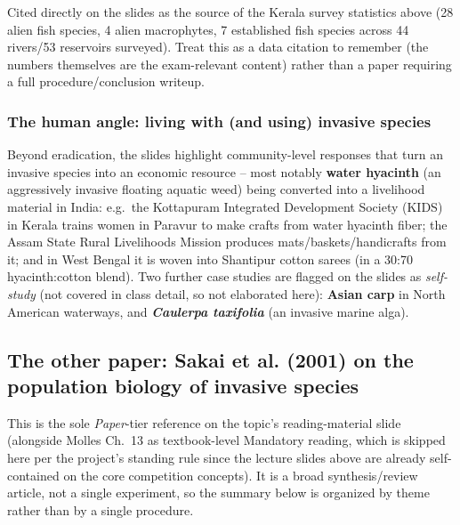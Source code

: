 \documentclass[11pt,a4paper]{article}
\begin{document}
\begin{papbox}[title={Slide case-study citation: Raj et al. (2021), \textit{Aquatic Ecosystem Health \& Management} 24(2), 64--75 -- ``Distribution of alien invasive species in aquatic ecosystems of the southern Western Ghats, India''}]
Cited directly on the slides as the source of the Kerala survey statistics above (28 alien fish species, 4 alien macrophytes, 7 established fish species across 44 rivers/53 reservoirs surveyed). Treat this as a data citation to remember (the numbers themselves are the exam-relevant content) rather than a paper requiring a full procedure/conclusion writeup.
\end{papbox}

\subsubsection*{The human angle: living with (and using) invasive species}
Beyond eradication, the slides highlight community-level responses that turn an invasive species into an economic resource -- most notably \textbf{water hyacinth} (an aggressively invasive floating aquatic weed) being converted into a livelihood material in India: e.g.\ the Kottapuram Integrated Development Society (KIDS) in Kerala trains women in Paravur to make crafts from water hyacinth fiber; the Assam State Rural Livelihoods Mission produces mats/baskets/handicrafts from it; and in West Bengal it is woven into Shantipur cotton sarees (in a 30:70 hyacinth:cotton blend). Two further case studies are flagged on the slides as \emph{self-study} (not covered in class detail, so not elaborated here): \textbf{Asian carp} in North American waterways, and \textbf{\emph{Caulerpa taxifolia}} (an invasive marine alga).

\subsection{The other paper: Sakai et al. (2001) on the population biology of invasive species}
This is the sole \emph{Paper}-tier reference on the topic's reading-material slide (alongside Molles Ch.\ 13 as textbook-level Mandatory reading, which is skipped here per the project's standing rule since the lecture slides above are already self-contained on the core competition concepts). It is a broad synthesis/review article, not a single experiment, so the summary below is organized by theme rather than by a single procedure.
\end{document}

